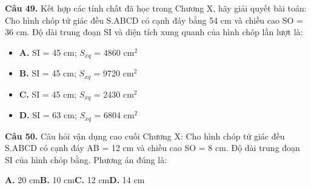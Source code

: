\documentclass[11pt,a4paper]{article}
\begin{document}
\textbf{\color{primary} Câu 49.} Kết hợp các tính chất đã học trong Chương X, hãy giải quyết bài toán: Cho hình chóp tứ giác đều S.ABCD có cạnh đáy bằng 54 cm và chiều cao SO = 36 cm. Độ dài trung đoạn SI và diện tích xung quanh của hình chóp lần lượt là:\par
\begin{itemize}\setlength{\itemsep}{1pt}\setlength{\parskip}{0pt}
  \item[] \textbf{A.} SI = 45 cm; $S_{xq}$ = 4860 cm$^2$
  \item[] \textbf{B.} SI = 45 cm; $S_{xq}$ = 9720 cm$^2$
  \item[] \textbf{C.} SI = 45 cm; $S_{xq}$ = 2430 cm$^2$
  \item[] \textbf{D.} SI = 63 cm; $S_{xq}$ = 6804 cm$^2$
\end{itemize}\vspace{2pt}
\textbf{\color{primary} Câu 50.} Câu hỏi vận dụng cao cuối Chương X: Cho hình chóp tứ giác đều S.ABCD có cạnh đáy AB = 12 cm và chiều cao SO = 8 cm. Độ dài trung đoạn SI của hình chóp bằng. Phương án đúng là:\par
\hspace*{1.5em}\textbf{A.} 20 cm\quad\quad \textbf{B.} 10 cm\quad\quad \textbf{C.} 12 cm\quad\quad \textbf{D.} 14 cm\par\vspace{2pt}
\end{document}
